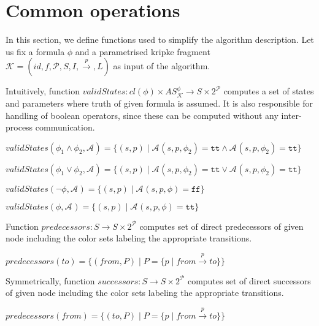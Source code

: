 \documentclass[12pt,oneside,draft]{fithesis2}
\newcommand{\as}[1][]{\ensuremath{\mathcal{A}_{#1}}}
\newcommand{\ASphi}{\ensuremath{AS_{\mathcal K}^\phi}}
\newcommand{\true}{\ensuremath{\texttt{tt}}}
\newcommand{\false}{\ensuremath{\texttt{ff}}}
\newcommand{\ks}[1][]{\ensuremath{\mathcal{K}_{#1}}}
\newcommand{\fullks}{\ensuremath{ \ks = (id, f, \params, S, I, \trans{p}, L) }}
\newcommand{\trans}[1]{\stackrel{#1}{\rightarrow}}
\newcommand{\params}{\mathcal{P}}
\begin{document}
    	\section{Common operations}
    		
    		In this section, we define functions used to simplify the algorithm description. Let us fix a formula $\phi$ and a parametrised kripke fragment $\fullks$ as input of the algorithm.
			
			Intuitively, function $validStates : cl(\phi) \times \ASphi \rightarrow S \times 2^\mathcal{P} $ computes a set of states and parameters where truth of given formula is assumed. It is also responsible for handling of boolean operators, since these can be computed without any inter-process communication. 
			
			\begin{center}
				$validStates(\phi_1 \wedge \phi_2, \as) = \{ (s, p) \mid \as(s, p, \phi_2) = \true \wedge \as(s, p, \phi_2) = \true \} $
			\end{center}
			
			\begin{center}
				$validStates(\phi_1 \vee \phi_2, \as) = \{ (s, p) \mid \as(s, p, \phi_2) = \true \vee \as(s, p, \phi_2) = \true \} $
			\end{center}
			
			\begin{center}
				$validStates(\neg\phi, \as) = \{ (s, p) \mid \as(s, p, \phi) = \false \} $
			\end{center}
			
			\begin{center}
				$validStates(\phi, \as) = \{ (s, p) \mid \as(s, p, \phi) = \true \} $
			\end{center}
			
			Function $predecessors : S \rightarrow S \times 2^\mathcal{P} $ computes set of direct predecessors of given node including the color sets labeling the appropriate transitions.
			
			\begin{center}
				$predecessors(to) = \{ (from, P) \mid P = \{ p \mid from \trans{p} to \} \} $
			\end{center}
			
			Symmetrically, function $successors : S \rightarrow S \times 2^\mathcal{P} $ computes set of direct successors of given node including the color sets labeling the appropriate transitions.

			\begin{center}
				$predecessors(from) = \{ (to, P) \mid P = \{ p \mid from \trans{p} to \} \} $
			\end{center}		
			
\end{document}
